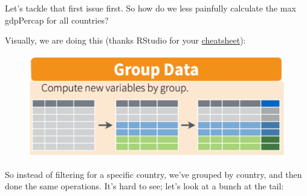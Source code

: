 \documentclass[]{book}
\newenvironment{Shaded}{\begin{snugshade}}{\end{snugshade}}
\newcommand{\KeywordTok}[1]{\textcolor[rgb]{0.13,0.29,0.53}{\textbf{#1}}}
\newcommand{\DataTypeTok}[1]{\textcolor[rgb]{0.13,0.29,0.53}{#1}}
\newcommand{\DecValTok}[1]{\textcolor[rgb]{0.00,0.00,0.81}{#1}}
\newcommand{\StringTok}[1]{\textcolor[rgb]{0.31,0.60,0.02}{#1}}
\newcommand{\CommentTok}[1]{\textcolor[rgb]{0.56,0.35,0.01}{\textit{#1}}}
\newcommand{\OperatorTok}[1]{\textcolor[rgb]{0.81,0.36,0.00}{\textbf{#1}}}
\newcommand{\NormalTok}[1]{#1}
\theoremstyle{definition}
\theoremstyle{definition}
\theoremstyle{definition}
\theoremstyle{remark}
\begin{document}
Let's tackle that first issue first. So how do we less painfully
calculate the max gdpPercap for all countries?

Visually, we are doing this (thanks RStudio for your
\href{http://www.rstudio.com/wp-content/uploads/2015/02/data-wrangling-cheatsheet.pdf}{cheatsheet}):

\begin{figure}
\centering
\includegraphics{img/rstudio-cheatsheet-group_by.png}
\caption{}
\end{figure}

\begin{Shaded}
\end{Shaded}

So instead of filtering for a specific country, we've grouped by
country, and then done the same operations. It's hard to see; let's look
at a bunch at the tail:

\begin{Shaded}
\end{Shaded}
\end{document}
